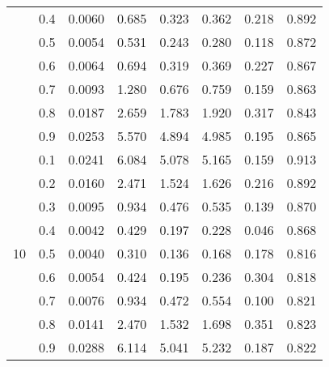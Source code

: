 \documentclass[11pt,a4paper]{report}
\begin{document}
\begin{longtable}{ | c | c || c | c | c | c | c | c | }
 & 0.4 & 0.0060 & 0.685 & 0.323 & 0.362 & 0.218 & 0.892 \\
 & 0.5 & 0.0054 & 0.531 & 0.243 & 0.280 & 0.118 & 0.872 \\
 & 0.6 & 0.0064 & 0.694 & 0.319 & 0.369 & 0.227 & 0.867 \\
 & 0.7 & 0.0093 & 1.280 & 0.676 & 0.759 & 0.159 & 0.863 \\
 & 0.8 & 0.0187 & 2.659 & 1.783 & 1.920 & 0.317 & 0.843 \\
 & 0.9 & 0.0253 & 5.570 & 4.894 & 4.985 & 0.195 & 0.865 \\
 \hline
\multirow{9}{*}{10} & 0.1 & 0.0241 & 6.084 & 5.078 & 5.165 & 0.159 & 0.913 \\
 & 0.2 & 0.0160 & 2.471 & 1.524 & 1.626 & 0.216 & 0.892 \\
 & 0.3 & 0.0095 & 0.934 & 0.476 & 0.535 & 0.139 & 0.870 \\
 & 0.4 & 0.0042 & 0.429 & 0.197 & 0.228 & 0.046 & 0.868 \\
 & 0.5 & 0.0040 & 0.310 & 0.136 & 0.168 & 0.178 & 0.816 \\
 & 0.6 & 0.0054 & 0.424 & 0.195 & 0.236 & 0.304 & 0.818 \\
 & 0.7 & 0.0076 & 0.934 & 0.472 & 0.554 & 0.100 & 0.821 \\
 & 0.8 & 0.0141 & 2.470 & 1.532 & 1.698 & 0.351 & 0.823 \\
 & 0.9 & 0.0288 & 6.114 & 5.041 & 5.232 & 0.187 & 0.822 \\
 \hline
\hline
\end{longtable}
\end{document}
